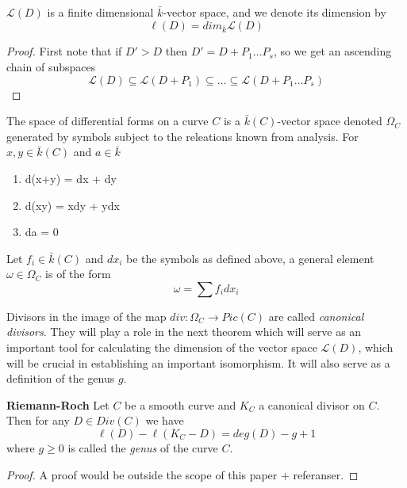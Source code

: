 \begin{prop}
 $\mathscr{L}(D)$ is a finite dimensional $\bar{k}$-vector space, and we denote
its dimension by
$$ \ell(D) = dim_{\bar{k}} \mathscr{L}(D) $$
\end{prop}
\begin{proof}
 First note that if $D' > D$ then $D' = D + P_1 \ldots P_s$, so we get an ascending chain of
subspaces
$$ \mathscr{L}(D) \subseteq \mathscr{L}(D+P_1) \subseteq \ldots \subseteq \mathscr{L}(D+P_1 \ldots P_s) $$

\end{proof}

\begin{mydef}
 The space of differential forms on a curve $C$ is a $\bar{k}(C)$-vector space denoted $\Omega_C$
generated by symbols subject to the releations known from analysis. 
For $x, y \in \bar{k}(C)$ and $a \in \bar{k}$
\begin{enumerate}
  \item d(x+y) = dx + dy
  \item d(xy) = xdy + ydx
  \item da = 0
\end{enumerate}
Let $f_i \in \bar{k}(C)$ and $dx_i$ be the symbols as defined above, a general
element $\omega \in \Omega_C$ is of the form
$$ \omega = \sum f_i dx_i $$
\end{mydef}

Divisors in the image of the map $div: \Omega_C \rightarrow Pic(C)$ are called
\emph{canonical divisors}. They will play a role in the next theorem which will
serve as an important tool for calculating the dimension of the vector space
$\mathscr{L}(D)$, which will be crucial in establishing an important isomorphism.
It will also serve as a definition of the genus $g$.

\begin{thm}
 \textbf{Riemann-Roch}
  Let $C$ be a smooth curve and $K_C$ a canonical divisor on $C$. Then for
any $D \in Div(C)$ we have
$$ \ell(D) - \ell(K_C - D) = deg(D) - g + 1 $$
where $g \geq 0$ is called the \emph{genus} of the curve $C$.
\end{thm}
\begin{proof}
 A proof would be outside the scope of this paper + referanser.
\end{proof}


